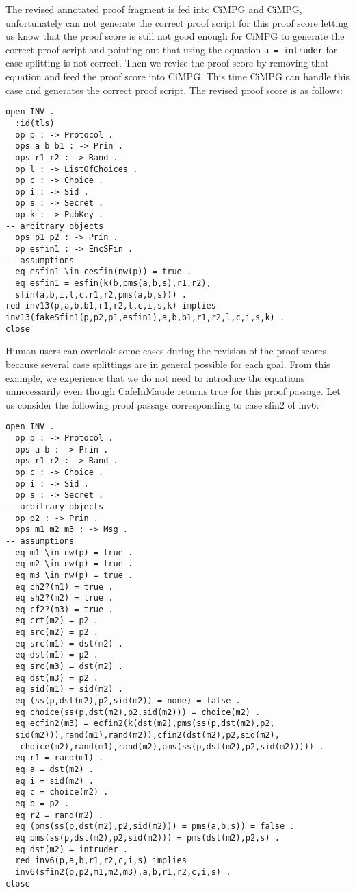 \documentclass[a4paper,fleqn]{cas-dc}
\begin{document}
The revised annotated proof fragment is fed into CiMPG and CiMPG, unfortunately can not generate the correct proof script for this proof score
letting us know that the proof score is still not good enough for CiMPG to generate the correct proof script and pointing out that using the equation \verb!a = intruder! for case splitting is not correct. Then we revise the proof score by removing that equation and feed the proof score into CiMPG. This time CiMPG can handle this case and generates the correct proof script. The revised proof score is as follows:
\begin{small}
\begin{verbatim}
open INV .
  :id(tls)
  op p : -> Protocol .
  ops a b b1 : -> Prin .
  ops r1 r2 : -> Rand .
  op l : -> ListOfChoices .
  op c : -> Choice .
  op i : -> Sid .
  op s : -> Secret .
  op k : -> PubKey .
-- arbitrary objects
  ops p1 p2 : -> Prin .
  op esfin1 : -> EncSFin .
-- assumptions
  eq esfin1 \in cesfin(nw(p)) = true .
  eq esfin1 = esfin(k(b,pms(a,b,s),r1,r2),
  sfin(a,b,i,l,c,r1,r2,pms(a,b,s))) .
red inv13(p,a,b,b1,r1,r2,l,c,i,s,k) implies
inv13(fakeSfin1(p,p2,p1,esfin1),a,b,b1,r1,r2,l,c,i,s,k) .
close
\end{verbatim}
\end{small}
Human users can overlook some cases during the revision of the proof scores because several case splittings are in general possible for each goal. From this example, we experience that we do not need to introduce the equations unnecessarily even though CafeInMaude returns true for this proof passage. 
Let us consider the following proof passage corresponding to case sfin2 of inv6:
\begin{small}
\begin{verbatim}
open INV .
  op p : -> Protocol .
  ops a b : -> Prin .
  ops r1 r2 : -> Rand .
  op c : -> Choice .
  op i : -> Sid .
  op s : -> Secret .
-- arbitrary objects
  op p2 : -> Prin .
  ops m1 m2 m3 : -> Msg .
-- assumptions
  eq m1 \in nw(p) = true .
  eq m2 \in nw(p) = true .
  eq m3 \in nw(p) = true .
  eq ch2?(m1) = true .
  eq sh2?(m2) = true .
  eq cf2?(m3) = true .
  eq crt(m2) = p2 .
  eq src(m2) = p2 .
  eq src(m1) = dst(m2) .
  eq dst(m1) = p2 .
  eq src(m3) = dst(m2) .
  eq dst(m3) = p2 .
  eq sid(m1) = sid(m2) .
  eq (ss(p,dst(m2),p2,sid(m2)) = none) = false .
  eq choice(ss(p,dst(m2),p2,sid(m2))) = choice(m2) .
  eq ecfin2(m3) = ecfin2(k(dst(m2),pms(ss(p,dst(m2),p2,
  sid(m2))),rand(m1),rand(m2)),cfin2(dst(m2),p2,sid(m2),
   choice(m2),rand(m1),rand(m2),pms(ss(p,dst(m2),p2,sid(m2))))) .
  eq r1 = rand(m1) .
  eq a = dst(m2) .
  eq i = sid(m2) .
  eq c = choice(m2) .
  eq b = p2 .
  eq r2 = rand(m2) .
  eq (pms(ss(p,dst(m2),p2,sid(m2))) = pms(a,b,s)) = false .
  eq pms(ss(p,dst(m2),p2,sid(m2))) = pms(dst(m2),p2,s) .
  eq dst(m2) = intruder .
  red inv6(p,a,b,r1,r2,c,i,s) implies
  inv6(sfin2(p,p2,m1,m2,m3),a,b,r1,r2,c,i,s) .
close
\end{verbatim}
\end{small}
\end{document}
